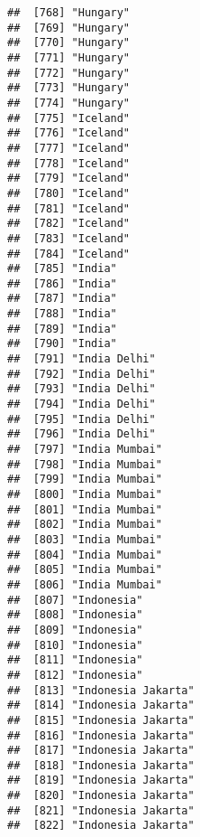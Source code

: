 \documentclass[]{article}
\begin{document}
\begin{verbatim}
##  [768] "Hungary"                            
##  [769] "Hungary"                            
##  [770] "Hungary"                            
##  [771] "Hungary"                            
##  [772] "Hungary"                            
##  [773] "Hungary"                            
##  [774] "Hungary"                            
##  [775] "Iceland"                            
##  [776] "Iceland"                            
##  [777] "Iceland"                            
##  [778] "Iceland"                            
##  [779] "Iceland"                            
##  [780] "Iceland"                            
##  [781] "Iceland"                            
##  [782] "Iceland"                            
##  [783] "Iceland"                            
##  [784] "Iceland"                            
##  [785] "India"                              
##  [786] "India"                              
##  [787] "India"                              
##  [788] "India"                              
##  [789] "India"                              
##  [790] "India"                              
##  [791] "India Delhi"                        
##  [792] "India Delhi"                        
##  [793] "India Delhi"                        
##  [794] "India Delhi"                        
##  [795] "India Delhi"                        
##  [796] "India Delhi"                        
##  [797] "India Mumbai"                       
##  [798] "India Mumbai"                       
##  [799] "India Mumbai"                       
##  [800] "India Mumbai"                       
##  [801] "India Mumbai"                       
##  [802] "India Mumbai"                       
##  [803] "India Mumbai"                       
##  [804] "India Mumbai"                       
##  [805] "India Mumbai"                       
##  [806] "India Mumbai"                       
##  [807] "Indonesia"                          
##  [808] "Indonesia"                          
##  [809] "Indonesia"                          
##  [810] "Indonesia"                          
##  [811] "Indonesia"                          
##  [812] "Indonesia"                          
##  [813] "Indonesia Jakarta"                  
##  [814] "Indonesia Jakarta"                  
##  [815] "Indonesia Jakarta"                  
##  [816] "Indonesia Jakarta"                  
##  [817] "Indonesia Jakarta"                  
##  [818] "Indonesia Jakarta"                  
##  [819] "Indonesia Jakarta"                  
##  [820] "Indonesia Jakarta"                  
##  [821] "Indonesia Jakarta"                  
##  [822] "Indonesia Jakarta"                  

\end{verbatim}
\end{document}
